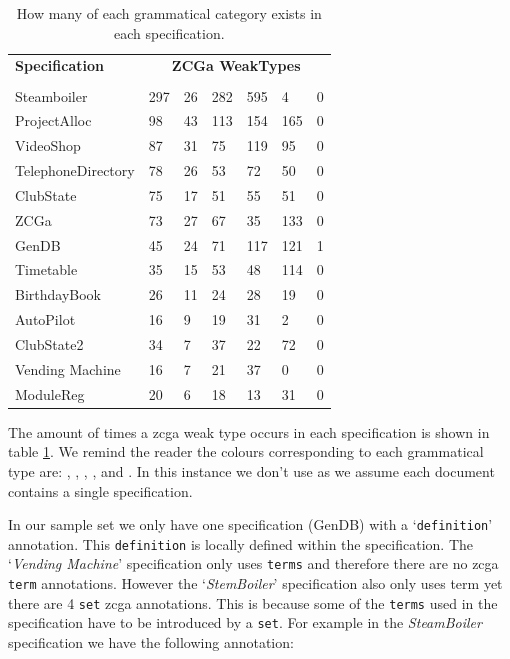 \begin{table}[H]
\centering
\begin{tabular}{|l |l | l |l | l| l | l |}
\hline
\textbf{Specification} & \multicolumn{6}{c|}{\textbf{ZCGa WeakTypes}}\\
\cline{2-7}
 & \cgatext{} & \declaration{} & \expression{} & \term{} & \set{} &
 {} \\
\hline
Steamboiler & 297 & 26 & 282 & 595 & 4 & 0 \\
ProjectAlloc & 98 & 43 & 113 & 154 & 165 & 0\\
VideoShop  & 87 & 31 & 75 & 119 & 95 & 0 \\
TelephoneDirectory & 78 & 26 & 53 & 72 & 50 & 0 \\
ClubState & 75 & 17 & 51 & 55 & 51 & 0 \\
ZCGa & 73 & 27 & 67 & 35 & 133 & 0 \\
GenDB & 45 & 24 & 71 & 117 & 121 & 1 \\
Timetable & 35 & 15 & 53 & 48 & 114 & 0 \\
BirthdayBook & 26 & 11 & 24 & 28 & 19 & 0 \\
AutoPilot & 16 & 9 & 19 & 31 & 2 & 0\\
ClubState2 & 34 & 7 & 37 & 22 & 72 & 0 \\
Vending Machine & 16 & 7 & 21 & 37 & 0 & 0 \\
ModuleReg & 20 & 6 & 18 & 13 & 31 & 0 \\
\hline
\end{tabular}
\caption{How many of each grammatical category exists in each specification. \label{tab:specgram}}
\end{table}

The amount of times a \gls{zcga} weak type occurs in each specification is shown
in table \ref{tab:specgram}. We remind the reader the colours corresponding to
each grammatical type are: , ,
, ,  and . In
this instance we don't use  as we assume each
document contains a single specification.

In our sample set we only have one specification (GenDB) with a
`\texttt{definition}' annotation. This \texttt{definition} is locally defined
within the specification. The `\emph{Vending Machine}' specification only uses
\texttt{terms} and therefore there are no \gls{zcga} \texttt{term} annotations.
However the `\emph{StemBoiler}' specification also only uses term yet there are
4 \texttt{set} \gls{zcga} annotations. This is because some of the
\texttt{terms} used in the specification have to be introduced by a \texttt{set}.
For example in the \emph{SteamBoiler} specification we have the following
annotation:

